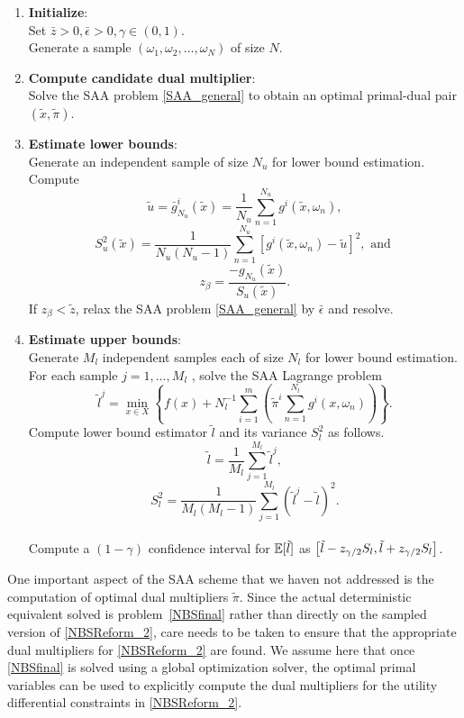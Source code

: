 \begin{framed}
	\begin{enumerate}[label={\bf Step \arabic*}.]
		\item{\textbf{Initialize}: \\
			Set $\bar{z} > 0, \bar{\epsilon} > 0, \gamma \in (0,1)$. \\
			Generate a sample $(\omega_1, \omega_2, \ldots, \omega_N)$ of size $N$.} 
		
		\item{\textbf{Compute candidate dual multiplier}: \\
			Solve the SAA problem \eqref{SAA_general} to obtain an optimal primal-dual pair
			$(\tilde{x}, \tilde{\pi})$.}
		
		\item{\textbf{Estimate lower bounds}: \\
			Generate an independent sample of size $N_u$ for lower bound estimation. \\
			Compute \[ \tilde{u} = \bar{g}^i_{N_u} (\tilde{x}) = \frac{1}{N_u}
			\sum_{n=1}^{N_u} g^i(\tilde{x}, \omega_n), \]
			\[ S_u^2 (\tilde{x}) = \frac{1}{N_u(N_u - 1)} \sum_{n=1}^{N_u} [g^i(\tilde{x}, \omega_n) -
			\tilde{u}]^2, \text{ and }\]
			\[ z_{\beta} = \frac{- g_{N_u}(\tilde{x})}{S_u(\tilde{x})}. \] 
			If $z_{\beta} < \tilde{z}$, relax the SAA problem \eqref{SAA_general} by
			$\bar{\epsilon}$ and resolve.}
		
		\item{\textbf{Estimate upper bounds}: \\
			Generate $M_l$ independent samples each of size $N_l$ for lower bound
			estimation. \\
			For each sample $j = 1, \ldots, M_l$ , solve the SAA Lagrange problem
			\[\tilde{l}^j = \min_{x \in X} \left\{ f(x) + N_l^{-1} \sum_{i=1}^m \left( \tilde{\pi}^i
			\sum_{n=1}^{N_l} g^i(x,\omega_n) \right)\right\}. \] 
			Compute lower bound estimator $\tilde{l}$ and its variance $S_l^2$ as follows.
			\[ \tilde{l} = \frac{1}{M_l} \sum_{j=1}^{M_l} \tilde{l}^j, \]
			\[ S_l^2 = \frac{1}{M_l(M_l - 1)} \sum_{j=1}^{M_l} (\tilde{l}^j - \tilde{l})^2.
			\]\\
			Compute a $(1 - \gamma)$ confidence interval for $\mathbb{E} [\tilde{l}]$ as $\displaystyle
			\left[ \tilde{l} - z_{\gamma / 2} S_{l}, \tilde{l} + z_{\gamma / 2} S_{l}
			\right]$.}
	\end{enumerate}
\end{framed}
One important aspect of the SAA scheme that we haven not addressed is the
computation of optimal dual multipliers $\tilde{\pi}$. Since the actual
deterministic equivalent solved is problem~\eqref{NBSfinal} rather than directly
on the sampled version of \eqref{NBSReform_2}, care needs to be taken to ensure
that the appropriate dual multipliers for \eqref{NBSReform_2} are found. We
assume here that once \eqref{NBSfinal} is solved using a global optimization
solver, the optimal primal variables can be used to explicitly compute the
dual multipliers for the utility differential constraints in \eqref{NBSReform_2}.

